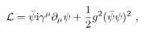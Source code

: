 \begin{equation}
{\cal L}= \bar{\psi} {\rm i}\gamma^{\mu} \partial_{\mu} \psi + \frac{1}{2} g^2 (\bar{\psi}\psi )^2 \ ,
\label{a1}
\end{equation}

